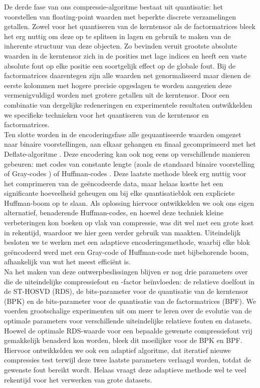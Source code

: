 De derde fase van ons compressie-algoritme bestaat uit quantisatie: het voorstellen van floating-point waarden met beperkte discrete verzamelingen getallen. Zowel voor het quantiseren van de kerntensor als de factormatrices bleek het erg nuttig om deze op te splitsen in lagen en gebruik te maken van de inherente structuur van deze objecten. Zo bevinden veruit grootste absolute waarden in de kerntensor zich in de posities met lage indices en heeft een vaste absolute fout op elke positie een soortgelijk effect op de globale fout. Bij de factormatrices daarentegen zijn alle waarden net genormaliseerd maar dienen de eerste kolommen met hogere precisie opgeslagen te worden aangezien deze vermenigvuldigd worden met grotere getallen uit de kerntensor. Door een combinatie van dergelijke redeneringen en experimentele resultaten ontwikkelden we specifieke technieken voor het quantiseren van de kerntensor en factormatrices.\\

Ten slotte worden in de encoderingsfase alle gequantiseerde waarden omgezet naar binaire voorstellingen, aan elkaar gehangen en finaal gecomprimeerd met het Deflate-algoritme \cite{ref:deflate}. Deze encodering kan ook nog eens op verschillende manieren gebeuren: met codes van constante lengte (zoals de standaard binaire voorstelling of Gray-codes \cite{ref:graycode}) of Huffman-codes \cite{ref:huffman_coding}. Deze laatste methode bleek erg nuttig voor het comprimeren van de ge\"encodeerde data, maar helaas kostte het een significante hoeveelheid geheugen om bij elke quantisatieblok een expliciete Huffman-boom op te slaan. Als oplossing hiervoor ontwikkelden we ook ons eigen alternatief, benaderende Huffman-codes, en hoewel deze techniek kleine verbeteringen kon boeken op vlak van compressie, was dit wel met een grote kost in rekentijd, waardoor we hier geen verder gebruik van maakten. Uiteindelijk besloten we te werken met een adaptieve encoderingsmethode, waarbij elke blok ge\"encodeerd werd met een Gray-code of Huffman-code met bijbehorende boom, afhankelijk van wat het meest effici\"ent is.\\

Na het maken van deze ontwerpbeslissingen blijven er nog drie parameters over die de uiteindelijke compressiefout en -factor be\"invloeden: de relatieve doelfout in de ST-HOSVD (RDS), de bits-parameter voor de quantisatie van de kerntensor (BPK) en de bits-parameter voor de quantisatie van de factormatrices (BPF). We voerden grootschalige experimenten uit om meer te leren over de evolutie van de optimale parameters voor verschillende uiteindelijke relatieve fouten en datasets. Hoewel de optimale RDS-waarde voor een bepaalde gewenste compressiefout vrij gemakkelijk benaderd kon worden, bleek dit moeilijker voor de BPK en BPF. Hiervoor ontwikkelden we ook een adaptief algoritme, dat iteratief nieuwe compressies test terwijl deze twee laatste parameters verlaagd worden, totdat de gewenste fout bereikt wordt. Helaas vraagt deze adaptieve methode wel te veel rekentijd voor het verwerken van grote datasets.

